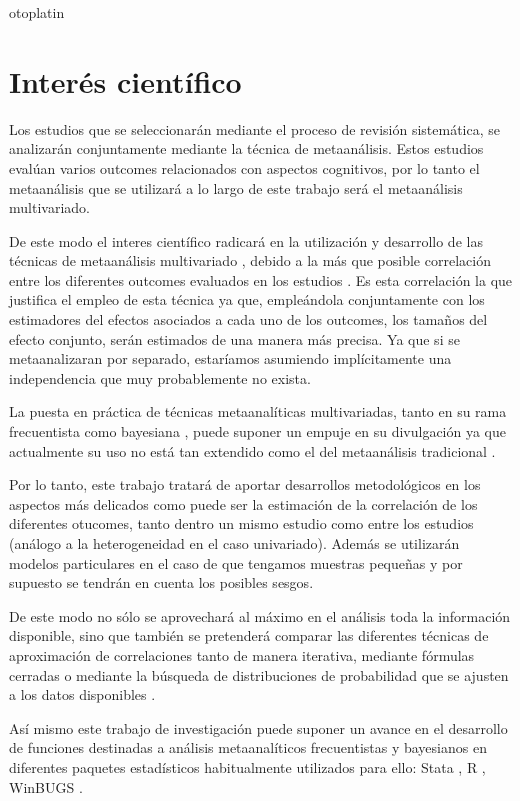 otoplatin\documentclass[a4paper,openright,12pt]{report}
\begin{document}
\section{Interés científico}
Los estudios que se seleccionarán mediante el proceso de revisión sistemática, se analizarán conjuntamente mediante la técnica de metaanálisis. Estos estudios evalúan varios outcomes relacionados con aspectos cognitivos, por lo tanto el metaanálisis que se utilizará a lo largo de este trabajo será el metaanálisis multivariado.

De este modo el interes científico radicará en la utilización y desarrollo de las técnicas de metaanálisis multivariado \cite{Becker2007}, debido a la más que posible correlación entre los diferentes outcomes evaluados en los estudios \cite{Berkey1996}\cite{Arends2003}. Es esta correlación la que justifica el empleo de esta técnica ya que, empleándola conjuntamente con los estimadores del efectos asociados a cada uno de los outcomes, los tamaños del efecto conjunto, serán estimados de una manera más precisa. Ya que si se metaanalizaran por separado, estaríamos asumiendo implícitamente una independencia que muy probablemente no exista.

La puesta en práctica de técnicas metaanalíticas multivariadas, tanto en su rama frecuentista como bayesiana \cite{Jackson2010} \cite{Nam2003}, puede suponer un empuje en su divulgación ya que actualmente su uso no está tan extendido como el del metaanálisis tradicional \cite{Jackson2011}.

Por lo tanto, este trabajo tratará de aportar desarrollos metodológicos en los aspectos más delicados como puede ser la estimación de la correlación de los diferentes otucomes, tanto dentro un mismo estudio como entre los estudios (análogo a la heterogeneidad en el caso univariado). Además se utilizarán modelos particulares en el caso de que tengamos muestras pequeñas y por supuesto se tendrán en cuenta los posibles sesgos.

De este modo no sólo se aprovechará al máximo en el análisis toda la información disponible, sino que también se pretenderá comparar las diferentes técnicas de aproximación de correlaciones \cite{Ishak2008}\cite{Riley2009} tanto de manera iterativa, mediante fórmulas cerradas \cite{Wei2013} o mediante la búsqueda de distribuciones de probabilidad que se ajusten a los datos disponibles \cite{Lambert2005}.

Así mismo este trabajo de investigación puede suponer un avance en el desarrollo de funciones destinadas a análisis metaanalíticos frecuentistas y bayesianos en diferentes paquetes estadísticos habitualmente utilizados para ello: Stata \cite{Stata}, R \cite{R}, WinBUGS \cite{WinBUGS}. 
\end{document}
